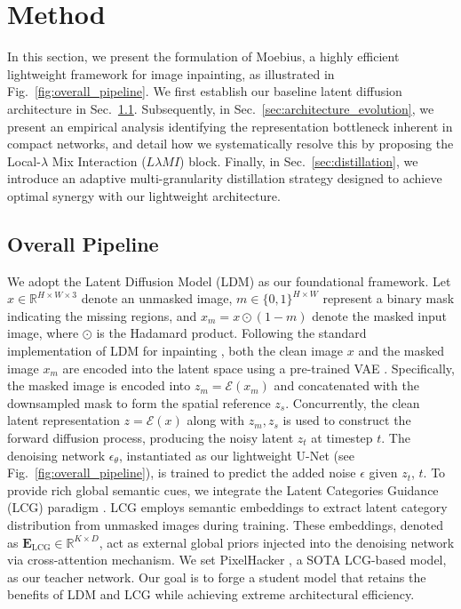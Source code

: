 \documentclass{llmxive}
\begin{document}
\vspace{-0.8em}
\section{Method}\label{sec:method}
\vspace{-0.5em}
In this section, we present the formulation of Moebius, a highly efficient light\-weight framework for image inpainting, as illustrated in Fig.~\ref{fig:overall_pipeline}. We first establish our baseline latent diffusion architecture in Sec.~\ref{sec:pipeline}. Subsequently, in Sec.~\ref{sec:architecture_evolution}, we present an empirical analysis identifying the representation bottleneck inherent in compact networks, and detail how we systematically resolve this by proposing the Local-$\lambda$ Mix Interaction ($L\lambda MI$) block. Finally, in Sec.~\ref{sec:distillation}, we introduce an adaptive multi-granularity distillation strategy designed to achieve optimal synergy with our lightweight architecture.

\vspace{-0.5em}
\subsection{Overall Pipeline}\label{sec:pipeline}
\vspace{-0.5em}
We adopt the Latent Diffusion Model (LDM) \cite{Rombach2022LDM} as our foundational framework. Let $x \in \mathbb{R}^{H \times W \times 3}$ denote an unmasked image, $m \in \{0,1\}^{H \times W}$ represent a binary mask indicating the missing regions, and $x_{m} = x \odot (1-m)$ denote the masked input image, where $\odot$ is the Hadamard product. Following the standard implementation of LDM for inpainting \cite{Rombach2022LDM,podell2023sdxl,esser2024SD3, ju2024brushnet}, both the clean image $x$ and the masked image $x_{m}$ are encoded into the latent space using a pre-trained VAE \cite{Rombach2022LDM}. Specifically, the masked image is encoded into $z_{m} = \mathcal{E}(x_{m})$ and concatenated with the downsampled mask to form the spatial reference $z_{s}$. Concurrently, the clean latent representation $z = \mathcal{E}(x)$ along with $z_{m}, z_{s}$ is used to construct the forward diffusion process, producing the noisy latent $z_t$ at timestep $t$. The denoising network $\epsilon_\theta$, instantiated as our lightweight U-Net (see Fig.~\ref{fig:overall_pipeline}), is trained to predict the added noise $\epsilon$ given $z_t$, $t$.
To provide rich global semantic cues, we integrate the Latent Categories Guidance (LCG) paradigm \cite{xu2025pixelhacker}. LCG employs semantic embeddings to extract latent category distribution from unmasked images during training. These embeddings, denoted as $\mathbf{E}_\text{LCG} \in \mathbb{R}^{K \times D}$, act as external global priors injected into the denoising network via cross-attention mechanism. We set PixelHacker \cite{xu2025pixelhacker}, a SOTA LCG-based model, as our teacher network. Our goal is to forge a student model that retains the benefits of LDM and LCG while achieving extreme architectural efficiency.
\end{document}
